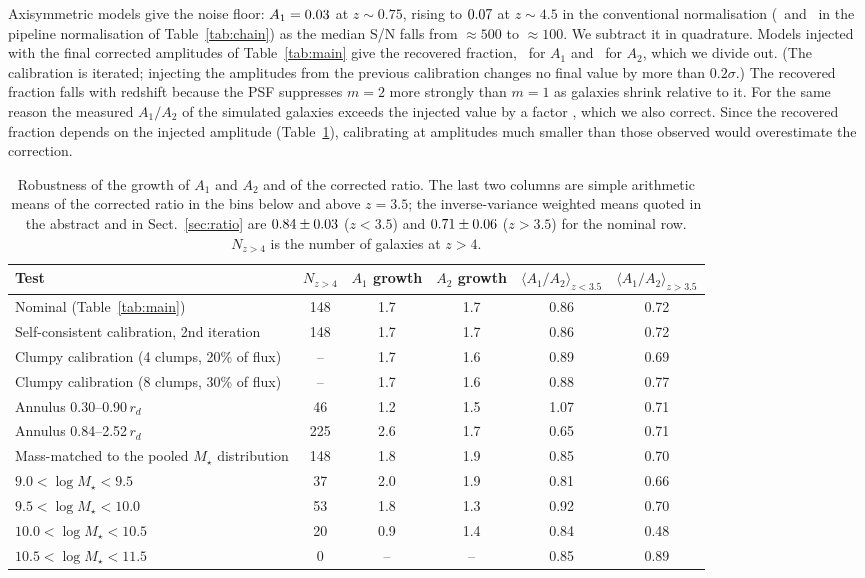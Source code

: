 \documentclass[fleqn,usenatbib]{mnras}
\begin{document}
Axisymmetric models give the noise floor: $A_1=0.03$ at
$z\sim0.75$, rising to $0.07$ at $z\sim4.5$ in the conventional
normalisation (\numFloorPipeLow\ and \numFloorPipeHigh\ in the pipeline
normalisation of Table~\ref{tab:chain}) as the median S/N falls from
$\approx500$ to $\approx100$. We subtract it in quadrature. Models injected with
the final corrected amplitudes of Table~\ref{tab:main} give the recovered
fraction, \numRecOneRange\ for $A_1$ and \numRecTwoRange\ for $A_2$, which we
divide out. (The calibration is iterated; injecting the amplitudes from the
previous calibration changes no final value by more than $0.2\sigma$.) The
recovered fraction falls with redshift because the PSF suppresses $m=2$ more
strongly than $m=1$ as galaxies shrink relative to it. For the same reason the
measured $A_1/A_2$ of the simulated galaxies exceeds the injected value by a
factor \numBiasRange, which we also correct. Since the recovered fraction depends
on the injected amplitude (Table~\ref{tab:robust}), calibrating at amplitudes
much smaller than those observed would overestimate the correction.

\begin{table}
\centering
\caption{Robustness of the growth of $A_1$ and $A_2$ and of the
corrected ratio. The last two columns are simple arithmetic means of
the corrected ratio in the bins below and above $z=3.5$; the
inverse-variance weighted means quoted in the abstract and in
Sect.~\ref{sec:ratio} are $0.84\pm0.03$ ($z<3.5$) and
$0.71\pm0.06$ ($z>3.5$) for the nominal row. $N_{z>4}$ is the
number of galaxies at $z>4$.}
\label{tab:robust}
\small
\begin{tabular}{lccccc}
\hline
{Test} & {$N_{z>4}$} & {$A_1$ growth} &
{$A_2$ growth} &
{$\langle A_1/A_2\rangle_{z<3.5}$} &
{$\langle A_1/A_2\rangle_{z>3.5}$}
\\
\hline
Nominal (Table~\ref{tab:main}) & 148 & 1.7 & 1.7 & 0.86 & 0.72\\
Self-consistent calibration, 2nd iteration & 148 & 1.7 & 1.7 & 0.86 & 0.72\\
Clumpy calibration (4 clumps, 20\% of flux) & -- & 1.7 & 1.6 & 0.89 & 0.69\\
Clumpy calibration (8 clumps, 30\% of flux) & -- & 1.7 & 1.6 & 0.88 & 0.77\\
Annulus 0.30--0.90\,$r_d$ & 46 & 1.2 & 1.5 & 1.07 & 0.71\\
Annulus 0.84--2.52\,$r_d$ & 225 & 2.6 & 1.7 & 0.65 & 0.71\\
Mass-matched to the pooled $M_\star$ distribution & 148 & 1.8 & 1.9 & 0.85 & 0.70\\
$9.0<\log M_\star<9.5$ & 37 & 2.0 & 1.9 & 0.81 & 0.66\\
$9.5<\log M_\star<10.0$ & 53 & 1.8 & 1.3 & 0.92 & 0.70\\
$10.0<\log M_\star<10.5$ & 20 & 0.9 & 1.4 & 0.84 & 0.48\\
$10.5<\log M_\star<11.5$ & 0 & -- & -- & 0.85 & 0.89\\
\hline
\end{tabular}
\end{table}
\end{document}
